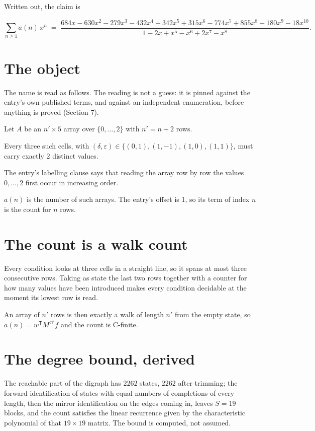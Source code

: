 \documentclass[11pt]{article}
\theoremstyle{definition}
\begin{document}
Written out, the claim is

\[\sum_{n \ge 1} a(n)\,x^n \;=\; \frac{684x - 630x^{2} - 279x^{3} - 432x^{4} - 342x^{5} + 315x^{6} - 774x^{7} + 855x^{8} - 180x^{9} - 18x^{10}}{1 - 2x + x^{5} - x^{6} + 2x^{7} - x^{8}}.\]

\section{The object}

The name is read as follows. The reading is not a guess: it is pinned against the entry's own published terms, and against an independent enumeration, before anything is proved (Section 7).

Let $A$ be an $n' \times 5$ array over $\{0,\dots,2\}$ with $n' = n + 2$ rows.

Every three such cells, with $(\delta,\varepsilon) \in \{(0,1), (1,-1), (1,0), (1,1)\}$, must carry exactly $2$ distinct values.

The entry's labelling clause says that reading the array row by row the values $0,\dots,2$ first occur in increasing order.

$a(n)$ is the number of such arrays. The entry's offset is 1, so its term of index $n$ is the count for $n$ rows.

\section{The count is a walk count}

Every condition looks at three cells in a straight line, so it spans at most three consecutive rows. Taking as state the last two rows together with a counter for how many values have been introduced makes every condition decidable at the moment its lowest row is read.

An array of $n'$ rows is then exactly a walk of length $n'$ from the empty state, so $a(n) = w^{\mathsf T}M^{\,n'}f$ and the count is C-finite.

\section{The degree bound, derived}

The reachable part of the digraph has $2262$ states, $2262$ after trimming; the forward identification of states with equal numbers of completions of every length, then the mirror identification on the edges coming in, leaves $S = 19$ blocks, and the count satisfies the linear recurrence given by the characteristic polynomial of that $19\times19$ matrix. The bound is computed, not assumed.
\end{document}
